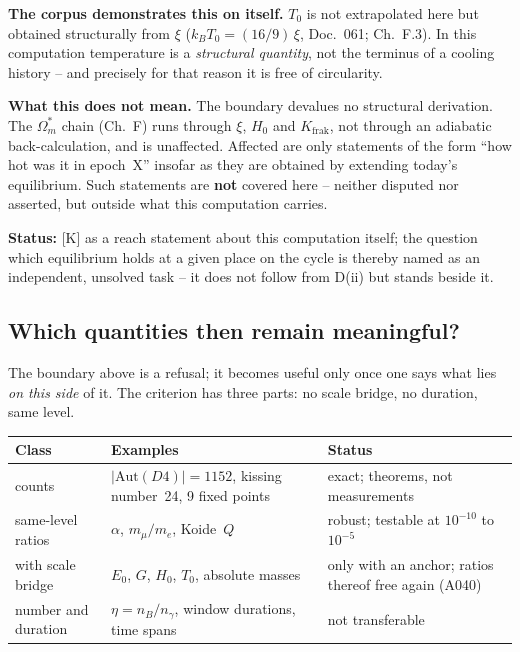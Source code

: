 \documentclass[11pt]{report}
\begin{document}
\textbf{The corpus demonstrates this on itself.} $T_0$ is not
extrapolated here but obtained structurally from $\xi$
($k_BT_0 = (16/9)\,\xi$, Doc.~061; Ch.~F.3). In this computation
temperature is a \emph{structural quantity}, not the terminus of a
cooling history -- and precisely for that reason it is free of
circularity.

\textbf{What this does not mean.} The boundary devalues no
structural derivation. The $\Omega_m^{*}$ chain (Ch.~F) runs
through $\xi$, $H_0$ and $K_\text{frak}$, not through an adiabatic
back-calculation, and is unaffected. Affected are only statements
of the form \enquote{how hot was it in epoch~X} insofar as they
are obtained by extending today's equilibrium. Such statements are
\textbf{not} covered here -- neither disputed nor asserted, but
outside what this computation carries.

\textbf{Status:} [K] as a reach statement about this computation
itself; the question which equilibrium holds at a given place on
the cycle is thereby named as an independent, unsolved task -- it
does not follow from D(ii) but stands beside it.

\subsection*{Which quantities then remain meaningful?}

The boundary above is a refusal; it becomes useful only once one
says what lies \emph{on this side} of it. The criterion has three
parts: no scale bridge, no duration, same level.

\begin{center}
\begin{tabular}{llp{4.6cm}}
\toprule
Class & Examples & Status \\
\midrule
counts & $|\text{Aut}(D4)| = 1152$, kissing number~24,
  9 fixed points & exact; theorems, not measurements \\
same-level ratios & $\alpha$, $m_\mu/m_e$, Koide~$Q$ &
  robust; testable at $10^{-10}$ to $10^{-5}$ \\
with scale bridge & $E_0$, $G$, $H_0$, $T_0$, absolute masses &
  only with an anchor; ratios thereof free again (A040) \\
number and duration & $\eta = n_B/n_\gamma$, window durations,
  time spans & not transferable \\
\bottomrule
\end{tabular}
\end{center}
\end{document}
